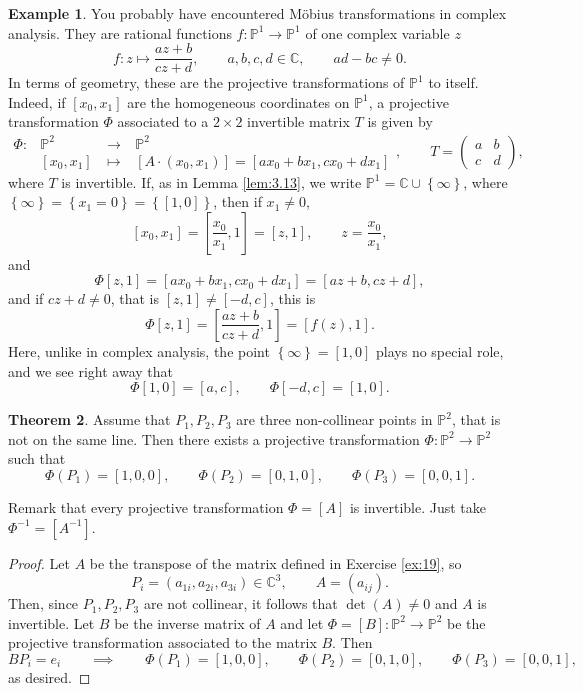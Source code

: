 \documentclass{article}
\newcommand{\C}{\mathbb{C}}
\renewcommand{\P}{\mathbb{P}}
\newcommand{\rb}[1]{\left( #1 \right)}
\renewcommand{\sb}[1]{\left[ #1 \right]}
\newcommand{\cb}[1]{\left\{ #1 \right\}}
\newcommand{\two}[2]{\begin{pmatrix} #1 \\ #2 \end{pmatrix}}
\theoremstyle{definition}\newtheorem{definition}{Definition}[section]
\theoremstyle{definition}\newtheorem{notation}[definition]{Notation}
\theoremstyle{definition}\newtheorem{remark}[definition]{Remark}
\theoremstyle{definition}\newtheorem{example1}[definition]{Example}
\theoremstyle{definition}\newtheorem{fact}{Fact}
\theoremstyle{definition}\newtheorem{exercise}{Exercise}
\theoremstyle{definition}\newtheorem*{example2}{Example}
\newtheorem{theorem}[definition]{Theorem}
\begin{document}
\begin{example1}
\label{eg:8.4}
You probably have encountered M\"obius transformations in complex analysis. They are rational functions $ f : \P^1 \to \P^1 $ of one complex variable $ z $
$$ f : z \mapsto \dfrac{az + b}{cz + d}, \qquad a, b, c, d \in \C, \qquad ad - bc \ne 0. $$
In terms of geometry, these are the projective transformations of $ \P^1 $ to itself. Indeed, if $ \sb{x_0, x_1} $ are the homogeneous coordinates on $ \P^1 $, a projective transformation $ \Phi $ associated to a $ 2 \times 2 $ invertible matrix $ T $ is given by
$$
\begin{array}{cccc}
\Phi : & \P^2 & \ \to \ & \P^2 \\
& \sb{x_0, x_1} & \ \mapsto \ & \sb{A \cdot \rb{x_0, x_1}} = \sb{ax_0 + bx_1, cx_0 + dx_1}
\end{array},
\qquad
T = \two{a & b}{c & d},
$$
where $ T $ is invertible. If, as in Lemma \ref{lem:3.13}, we write $ \P^1 = \C \cup \cb{\infty} $, where $ \cb{\infty} = \cb{x_1 = 0} = \cb{\sb{1, 0}} $, then if $ x_1 \ne 0 $,
$$ \sb{x_0, x_1} = \sb{\dfrac{x_0}{x_1}, 1} = \sb{z, 1}, \qquad z = \dfrac{x_0}{x_1}, $$
and
$$ \Phi\sb{z, 1} = \sb{ax_0 + bx_1, cx_0 + dx_1} = \sb{az + b, cz + d}, $$
and if $ cz + d \ne 0 $, that is $ \sb{z, 1} \ne \sb{-d, c} $, this is
$$ \Phi\sb{z, 1} = \sb{\dfrac{az + b}{cz + d}, 1} = \sb{f\rb{z}, 1}. $$
Here, unlike in complex analysis, the point $ \cb{\infty} = \sb{1, 0} $ plays no special role, and we see right away that
$$ \Phi\sb{1, 0} = \sb{a, c}, \qquad \Phi\sb{-d, c} = \sb{1, 0}. $$
\end{example1}

\begin{theorem}
\label{thm:8.5}
Assume that $ P_1, P_2, P_3 $ are three non-collinear points in $ \P^2 $, that is not on the same line. Then there exists a projective transformation $ \Phi : \P^2 \to \P^2 $ such that
$$ \Phi\rb{P_1} = \sb{1, 0, 0}, \qquad \Phi\rb{P_2} = \sb{0, 1, 0}, \qquad \Phi\rb{P_3} = \sb{0, 0, 1}. $$
\end{theorem}

Remark that every projective transformation $ \Phi = \sb{A} $ is invertible. Just take $ \Phi^{-1} = \sb{A^{-1}} $.

\begin{proof}
Let $ A $ be the transpose of the matrix defined in Exercise \ref{ex:19}, so
$$ P_i = \rb{a_{1i}, a_{2i}, a_{3i}} \in \C^3, \qquad A = \rb{a_{ij}}. $$
Then, since $ P_1, P_2, P_3 $ are not collinear, it follows that $ \det\rb{A} \ne 0 $ and $ A $ is invertible. Let $ B $ be the inverse matrix of $ A $ and let $ \Phi = \sb{B} : \P^2 \to \P^2 $ be the projective transformation associated to the matrix $ B $. Then
$$ BP_i = e_i \qquad \implies \qquad \Phi\rb{P_1} = \sb{1, 0, 0}, \qquad \Phi\rb{P_2} = \sb{0, 1, 0}, \qquad \Phi\rb{P_3} = \sb{0, 0, 1}, $$
as desired.
\end{proof}
\end{document}
